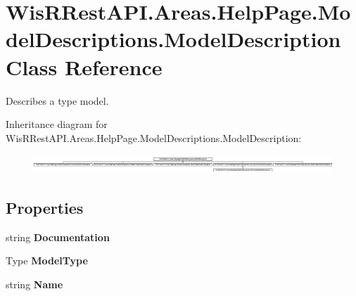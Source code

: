 \hypertarget{class_wis_r_rest_a_p_i_1_1_areas_1_1_help_page_1_1_model_descriptions_1_1_model_description}{}\section{Wis\+R\+Rest\+A\+P\+I.\+Areas.\+Help\+Page.\+Model\+Descriptions.\+Model\+Description Class Reference}
\label{class_wis_r_rest_a_p_i_1_1_areas_1_1_help_page_1_1_model_descriptions_1_1_model_description}


Describes a type model.  


Inheritance diagram for Wis\+R\+Rest\+A\+P\+I.\+Areas.\+Help\+Page.\+Model\+Descriptions.\+Model\+Description\+:\begin{figure}[H]
\begin{center}
\leavevmode
\includegraphics[height=0.701461cm]{class_wis_r_rest_a_p_i_1_1_areas_1_1_help_page_1_1_model_descriptions_1_1_model_description}
\end{center}
\end{figure}
\subsection*{Properties}
\begin{DoxyCompactItemize}
\item 
\hypertarget{class_wis_r_rest_a_p_i_1_1_areas_1_1_help_page_1_1_model_descriptions_1_1_model_description_aff6712cda2be54460c8142a2353d2bcf}{}string {\bfseries Documentation}\label{class_wis_r_rest_a_p_i_1_1_areas_1_1_help_page_1_1_model_descriptions_1_1_model_description_aff6712cda2be54460c8142a2353d2bcf}

\item 
\hypertarget{class_wis_r_rest_a_p_i_1_1_areas_1_1_help_page_1_1_model_descriptions_1_1_model_description_a109bc3136042a0d9e463402268ee73ba}{}Type {\bfseries Model\+Type}\label{class_wis_r_rest_a_p_i_1_1_areas_1_1_help_page_1_1_model_descriptions_1_1_model_description_a109bc3136042a0d9e463402268ee73ba}

\item 
\hypertarget{class_wis_r_rest_a_p_i_1_1_areas_1_1_help_page_1_1_model_descriptions_1_1_model_description_ac850e1366a73a15036a04b72009e8096}{}string {\bfseries Name}\label{class_wis_r_rest_a_p_i_1_1_areas_1_1_help_page_1_1_model_descriptions_1_1_model_description_ac850e1366a73a15036a04b72009e8096}

\end{DoxyCompactItemize}


